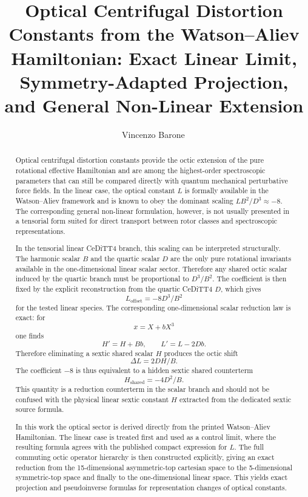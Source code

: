 \documentclass[aip,jcp,reprint,floatfix]{revtex4-2}
\begin{document}
\title{Optical Centrifugal Distortion Constants from the Watson--Aliev Hamiltonian: Exact Linear Limit, Symmetry-Adapted Projection, and General Non-Linear Extension}

\author{Vincenzo Barone\,}

\begin{abstract}
Optical centrifugal distortion constants provide the octic extension of the
pure rotational effective Hamiltonian and are among the highest-order
spectroscopic parameters that can still be compared directly with quantum
mechanical perturbative force fields. In the linear case, the optical constant
\(L\) is formally available in the Watson--Aliev framework and is known to obey
the dominant scaling \(L B^2/D^3 \approx -8\). The corresponding general
non-linear formulation, however, is not usually presented in a tensorial form
suited for direct transport between rotor classes and spectroscopic
representations.

In the tensorial linear CeDiTT4 branch, this scaling can be interpreted
structurally. The harmonic scalar \(B\) and the quartic scalar \(D\) are the
only pure rotational invariants available in the one-dimensional linear scalar
sector. Therefore any shared octic scalar induced by the quartic branch must be
proportional to \(D^3/B^2\). The coefficient is then fixed by the explicit
reconstruction from the quartic CeDiTT4 \(D\), which gives
\[
L_{\mathrm{offset}}=-8D^3/B^2
\]
for the tested linear species.
The corresponding one-dimensional scalar reduction law is exact: for
\[
x = X + bX^3
\]
one finds
\[
H' = H + Bb,
\qquad
L' = L - 2Db.
\]
Therefore eliminating a sextic shared scalar \(H\) produces the octic shift
\[
\Delta L = 2DH/B.
\]
The coefficient \(-8\) is thus equivalent to a hidden sextic shared
counterterm
\[
H_{\mathrm{shared}}=-4D^2/B.
\]
This quantity is a reduction counterterm in the scalar branch and should not
be confused with the physical linear sextic constant \(H\) extracted from the
dedicated sextic source formula.

In this work the optical sector is derived directly from the printed
Watson--Aliev Hamiltonian. The linear case is treated first and used as a
control limit, where the resulting formula agrees with the published compact
expression for \(L\). The full commuting octic operator hierarchy is then
constructed explicitly, giving an exact reduction from the 15-dimensional
asymmetric-top cartesian space to the 5-dimensional symmetric-top space and
finally to the one-dimensional linear space. This yields exact projection and
pseudoinverse formulas for representation changes of optical constants.


\end{abstract}
\end{document}
